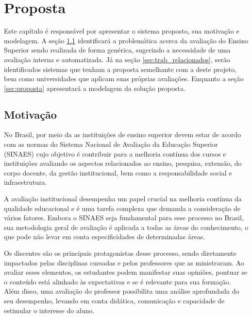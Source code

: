 \chapter{Proposta}\label{chp:PROPOSTA}


Este capítulo é responsável por apresentar o sistema proposto, sua motivação e modelagem.
A seção \ref{sec:motivacao} identificará a problemática acerca da avaliação do Ensino Superior sendo realizada de forma genérica, sugerindo a necessidade de uma avaliação interna e automatizada. Já na seção \ref{sec:trab_relacionados}, serão identificados sistemas que tenham a proposta semelhante com a deste projeto, bem como universidades que aplicam suas próprias avaliações. Enquanto a seção \ref{sec:proposta} apresentará a modelagem da solução proposta.

\section{Motivação}
\label{sec:motivacao}


No Brasil, por meio da  as instituições de ensino superior devem estar de acordo com as normas do Sistema Nacional de Avaliação da Educação Superior (SINAES)
cujo objetivo é contribuir para a melhoria contínua dos cursos e instituições avaliando 
os aspectos relacionados ao ensino, pesquisa, extensão, do corpo docente, da gestão institucional, bem como a responsabilidade social e infraestrutura.


A avaliação institucional desempenha um papel crucial na melhoria contínua da qualidade educacional
e é uma tarefa complexa que demanda a consideração de vários fatores. Embora o SINAES seja fundamental para esse processo no Brasil, sua metodologia geral de avaliação é aplicada a todas as áreas do conhecimento, o que pode não levar em conta especificidades de determinadas áreas.


Os discentes são os principais protagonistas desse processo, sendo diretamente impactados pelas disciplinas cursadas e pelos professores que as ministraram. Ao avaliar esses elementos, os estudantes podem manifestar suas opiniões, pontuar se o conteúdo está alinhado às expectativas e se é relevante para sua formação. Além disso, uma avaliação do professor possibilita uma análise aprofundada do seu desempenho, levando em conta didática, comunicação e capacidade de estimular o interesse do aluno.

